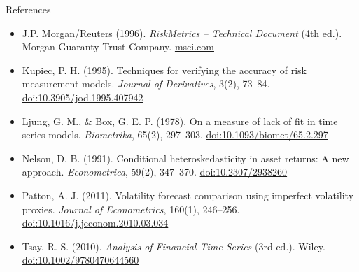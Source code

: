 \begin{frame}{References}
\begin{itemize}
    \item J.P. Morgan/Reuters (1996). \textit{RiskMetrics -- Technical Document} (4th ed.). Morgan Guaranty Trust Company. \href{https://www.msci.com/documents/10199/5915b101-4206-4ba0-aee2-3449d5c7e95a}{msci.com}
    \item Kupiec, P. H. (1995). Techniques for verifying the accuracy of risk measurement models. \textit{Journal of Derivatives}, 3(2), 73--84. \href{https://doi.org/10.3905/jod.1995.407942}{doi:10.3905/jod.1995.407942}
    \item Ljung, G. M., \& Box, G. E. P. (1978). On a measure of lack of fit in time series models. \textit{Biometrika}, 65(2), 297--303. \href{https://doi.org/10.1093/biomet/65.2.297}{doi:10.1093/biomet/65.2.297}
    \item Nelson, D. B. (1991). Conditional heteroskedasticity in asset returns: A new approach. \textit{Econometrica}, 59(2), 347--370. \href{https://doi.org/10.2307/2938260}{doi:10.2307/2938260}
    \item Patton, A. J. (2011). Volatility forecast comparison using imperfect volatility proxies. \textit{Journal of Econometrics}, 160(1), 246--256. \href{https://doi.org/10.1016/j.jeconom.2010.03.034}{doi:10.1016/j.jeconom.2010.03.034}
    \item Tsay, R. S. (2010). \textit{Analysis of Financial Time Series} (3rd ed.). Wiley. \href{https://doi.org/10.1002/9780470644560}{doi:10.1002/9780470644560}
\end{itemize}
\end{frame}



